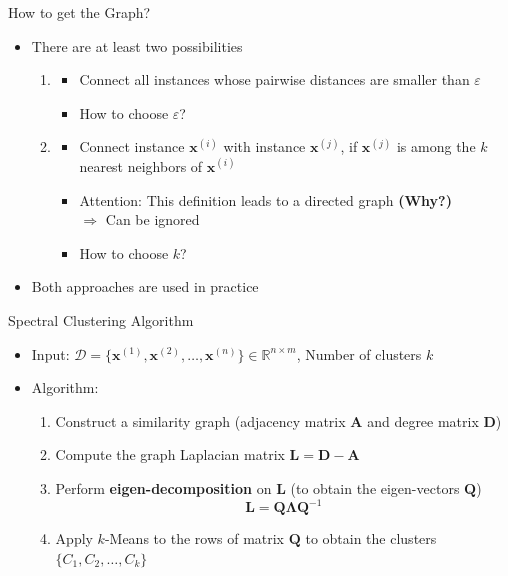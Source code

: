 \begin{frame}{How to get the Graph?}{}\important
	\begin{itemize}
		\item There are at least two possibilities
		\begin{enumerate}
			\item {}
			\begin{itemize}
				\item Connect all instances whose pairwise distances are smaller than $\varepsilon$
				\item {} How to choose $\varepsilon$?
			\end{itemize}
			\item {}
			\begin{itemize}
				\item Connect instance $\bm{x}^{(i)}$ with instance $\bm{x}^{(j)}$, if $\bm{x}^{(j)}$ is among the $k$ nearest neighbors of $\bm{x}^{(i)}$
				\item Attention: This definition leads to a directed graph \textbf{(Why?)} \\
					$\Rightarrow$ Can be ignored
				\item {} How to choose $k$?
			\end{itemize}
		\end{enumerate}
		\item Both approaches are used in practice
	\end{itemize}
\end{frame}


\begin{frame}{Spectral Clustering Algorithm}{}\important
	\begin{itemize}
		\item Input: $\mathcal{D} = \{ \bm{x}^{(1)}, \bm{x}^{(2)}, \dots, \bm{x}^{(n)} \} \in \mathbb{R}^{n \times m}$,
			Number of clusters $k$
		\item Algorithm:
		\begin{enumerate}
			\item Construct a similarity graph (adjacency matrix $\bm{A}$ and degree matrix $\bm{D}$)
			\item Compute the graph Laplacian matrix $\bm{L} = \bm{D} - \bm{A}$
			\item Perform \textbf{eigen-decomposition} on $\bm{L}$ (to obtain the eigen-vectors $\bm{Q}$)
			\begin{equation*}
				\bm{L} = \bm{Q}\bm{\Lambda}\bm{Q}^{-1}
			\end{equation*}
			\item Apply $k$-Means to the rows of matrix $\bm{Q}$ to obtain the clusters $\{ C_1, C_2, \dots, C_k \}$
		\end{enumerate} 
	\end{itemize}
\end{frame}


